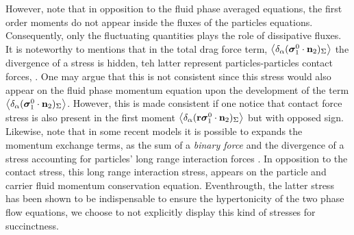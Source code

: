 However, note that in opposition to the fluid phase averaged equations, the first order moments do not appear inside the fluxes of the particles equations. 
Consequently, only the fluctuating quantities plays the role of dissipative fluxes. 
It is noteworthy to mentions that in the total drag force term, $ \left<\delta_\alpha ( {\bm{\sigma}_1^0 \cdot \textbf{n}_2} )_{\Sigma}\right>$ the divergence of a stress is hidden, teh latter represent particles-particles contact forces, \citet{jackson1997locally,zhang1997momentum}. 
One may argue that this is not consistent since this stress would also appear on the fluid phase momentum equation upon the development of the term $\left<\delta_\alpha ( \bm{\sigma}_1^0\cdot\textbf{n}_2 )_{\Sigma}\right>$. 
However, this is made consistent if one notice that contact force stress is also present in the first moment $\left<\delta_\alpha ( \textbf{r}\bm{\sigma}_1^0\cdot\textbf{n}_2 )_{\Sigma}\right>$ but with opposed sign. 
Likewise, note that in some recent models it is possible to expands the momentum exchange terms, as the sum of a \textit{binary force} and the divergence of a stress accounting for particles' long range interaction forces \citep{zhang2021ensemble,nott2011suspension}. 
In opposition to the contact stress, this long range interaction stress, appears on the particle and carrier fluid momentum conservation equation. 
Eventhrougth, the latter stress has been shown to be indispensable to ensure the hypertonicity of the two phase flow equations\citep{fox2020hyperbolic}, we choose to not explicitly display this kind of stresses for succinctness. 


